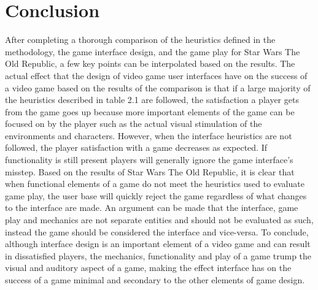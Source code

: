 \documentclass[12pt]{report}
\begin{document}
\section{Conclusion}
After completing a thorough comparison of the heuristics defined in the methodology, the game interface design, and the game play for Star Wars The Old Republic, a few key points can be interpolated based on the results. The actual effect that the design of video game user interfaces have on the success of a video game based on the results of the comparison is that if a large majority of the heuristics described in table 2.1 are followed, the satisfaction a player gets from the game goes up because more important elements of the game can be focused on by the player such as the actual visual stimulation of the environments and characters. However, when the interface heuristics are not followed, the player satisfaction with a game decreases as expected. If functionality is still present players will generally ignore the game interface's misstep. Based on the results of Star Wars The Old Republic, it is clear that when functional elements of a game do not meet the heuristics used to evaluate game play, the user base will quickly reject the game regardless of what changes to the interface are made. An argument can be made that the interface, game play and mechanics are not separate entities and should not be evaluated as such, instead the game should be considered the interface and vice-versa\cite{Federoff}. To conclude, although interface design is an important element of a video game and can result in dissatisfied players, the mechanics, functionality and play of a game trump the visual and auditory aspect of a game, making the effect interface has on the success of a game minimal and secondary to the other elements of game design.



\end{document}
